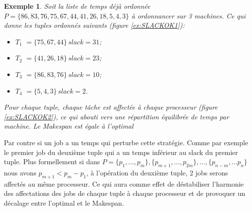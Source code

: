 \documentclass[a4paper,12pt]{report}
\theoremstyle{plain}				%
\newtheorem{example}{Exemple}
\theoremstyle{definition}				%
\begin{document}
\begin{example}
Soit la liste de temps déjà ordonnée $P = \{86, 83, 76, 75, 67, 44, 41, 26, 18, 5, 4, 3\}$ à ordonnancer sur 3 machines. Ce qui donne les tuples ordonnés suivants (figure \ref{ex:SLACKOK1}):
\begin{itemize}
	\item $T_1$ $=\{75, 67, 44\} \, slack = 31$; 
	\item $T_2$ $=\{41, 26, 18\} \, slack = 23$; 
	\item $T_3$ $=\{86, 83, 76\} \, slack = 10$;
	\item $T_4$ $=\{5, 4, 3\} \, slack = 2$.
\end{itemize}


Pour chaque tuple, chaque tâche est affectée à chaque processeur (figure \ref{ex:SLACKOK2}), ce qui abouti vers une répartition équilibrée de temps par machine. Le Makespan est égale à l'optimal

\end{example}

Par contre si un job a un temps qui perturbe cette stratégie. Comme par exemple le premier job du deuxième tuple qui a un temps inférieur au slack du premier tuple. 
Plus formellement si dans 
$P = \{p_1, \ldots, p_m\}, \{p_{m+1}, \ldots, p_{2m}\}, \ldots, \{p_{n-m}, \ldots p_n\}$ 
nous avons $p_{m+1} < p_m - p_1$, à l’opération du deuxième tuple, 2 jobs serons affectés au même processeur. Ce qui aura comme effet de déstabiliser l'harmonie des affectations des jobs de chaque tuple à chaque processeur et de provoquer un décalage entre l'optimal et le Makespan.

 
\end{document}
